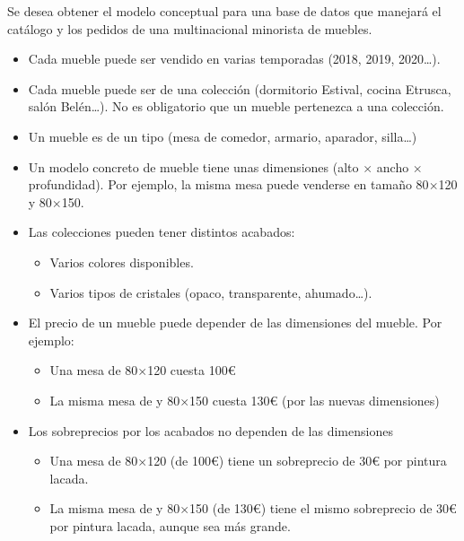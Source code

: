 Se desea obtener el modelo conceptual para una base de datos que manejará el catálogo y los pedidos de una multinacional minorista de muebles.
\begin{itemize}
\item Cada mueble puede ser vendido en varias temporadas (2018, 2019, 2020…).
\item Cada mueble puede ser de una colección (dormitorio Estival, cocina Etrusca, salón Belén…). No es obligatorio que un mueble pertenezca a una colección.
  
\item Un mueble es de un tipo (mesa de comedor, armario, aparador, silla\ldots)
\item Un modelo concreto de mueble tiene unas dimensiones (alto $\times$ ancho $\times$ profundidad). Por ejemplo, la misma mesa puede venderse en tamaño 80$\times$120 y 80$\times$150.
\item Las colecciones pueden tener distintos acabados:
  \begin{itemize}
  \item Varios colores disponibles.
  \item Varios tipos de cristales (opaco, transparente, ahumado…).
  \end{itemize}
\item El precio de un mueble puede depender de las dimensiones del mueble. Por ejemplo:
  \begin{itemize}
  \item Una mesa de 80$\times$120 cuesta 100{\euro}
  \item La misma mesa de y 80$\times$150 cuesta 130{\euro} (por las nuevas dimensiones)
  \end{itemize}
\item Los sobreprecios por los acabados no dependen de las dimensiones
  \begin{itemize}
  \item Una mesa de 80$\times$120 (de 100{\euro}) tiene un sobreprecio de 30{\euro} por pintura lacada.
  \item La misma mesa de y 80$\times$150 (de 130{\euro}) tiene el mismo sobreprecio de 30{\euro} por pintura lacada, aunque sea más grande.
  \end{itemize}
  
\end{itemize}


